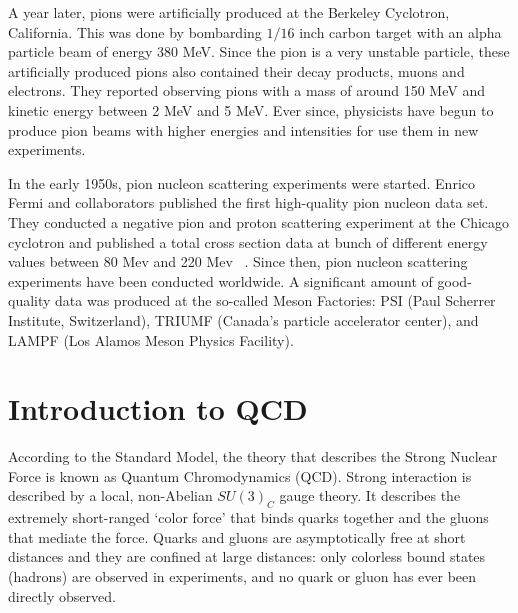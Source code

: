 A year later, pions were artificially produced at the Berkeley Cyclotron, California\cite{FirstPionsBerkeley}. This was done by bombarding $1/16$ inch carbon target with an alpha particle beam of energy 380 MeV. Since the pion is a very unstable particle, these artificially produced pions also contained their decay products, muons and electrons. They reported observing pions with a mass of around 150 MeV and kinetic energy between 2 MeV and 5 MeV. Ever since, physicists have begun to produce pion beams with higher energies and intensities for use them in new experiments.


In the early 1950s, pion nucleon scattering experiments were started. Enrico Fermi and collaborators published the first high-quality pion nucleon data set. They conducted a negative pion and proton scattering experiment at the Chicago cyclotron and published a total cross section data at bunch of different energy values between 80 Mev and 220 Mev  \cite{PiNScatteringFermi1952}. Since then, pion nucleon scattering experiments have been conducted worldwide. A significant amount of good-quality data was produced at the so-called Meson Factories: PSI (Paul Scherrer Institute, Switzerland), TRIUMF (Canada's particle accelerator center), and LAMPF (Los Alamos Meson Physics Facility).


\section{Introduction to QCD}


According to the Standard Model, the theory that describes the Strong Nuclear Force is known as Quantum Chromodynamics (QCD). Strong interaction is described by a local, non-Abelian $SU(3)_C$ gauge theory. It describes the extremely short-ranged ‘color force’ that binds quarks together and the gluons that mediate the force. Quarks and gluons are asymptotically free at short distances and they are confined at large distances: only colorless bound states (hadrons) are observed in experiments, and no quark or gluon has ever been directly observed.


